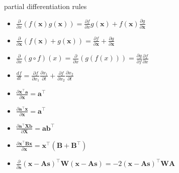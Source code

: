 \documentclass[UTF8,a4paper]{article}
\begin{document}
\begin{cheatsheetblock}{partial differentiation rules}
    \begin{itemize}
        \item $\frac{\partial}{\partial x}(f(\boldsymbol{x}) g(\boldsymbol{x}))=\frac{\partial f}{\partial x} g(\boldsymbol{x})+f(\boldsymbol{x}) \frac{\partial g}{\partial \boldsymbol{x}}$ \hfill {}
        \item $\frac{\partial}{\partial \boldsymbol{x}}(f(\boldsymbol{x})+g(\boldsymbol{x}))=\frac{\partial f}{\partial \boldsymbol{x}}+\frac{\partial g}{\partial \boldsymbol{x}}$ \hfill {}
        \item $\frac{\partial}{\partial x}(g \circ f)(x)=\frac{\partial}{\partial x}(g(f(x)))=\frac{\partial g}{\partial f} \frac{\partial f}{\partial x}$ \hfill {}
        \item $\frac{d f}{d t}=\frac{\partial f}{\partial x_1} \frac{\partial x_1}{\partial t}+\frac{\partial f}{\partial x_2} \frac{\partial x_2}{\partial t}$     \hfill {}
        \item $\frac{\partial \bm{x}^\top \bm{a}}{\partial \bm{x}} = \bm{a}^\top$
        \item $\frac{\partial \bm{a}^\top \bm{x}}{\partial \bm{x}} = \bm{a}^\top$
        \item $\frac{\partial \bm{a}^\top \bm{X} \bm{b}}{\partial \bm{X}} = \bm{a} \bm{b}^\top$
        \item $\frac{\partial \bm{x}^\top \bm{B} \bm{x}}{\partial \bm{x}} = \bm{x}^\top (\bm{B} + \bm{B}^\top)$
        \item $\frac{\partial}{\partial \bm{s}} (\bm{x} - \bm{A}\bm{s})^\top \bm{W} (\bm{x} - \bm{A}\bm{s}) = -2 (\bm{x} - \bm{A}\bm{s})^\top \bm{WA}$
    \end{itemize}
\end{cheatsheetblock}
\end{document}
